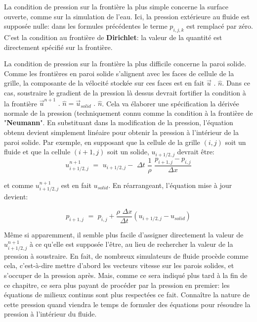 \documentclass[11pt]{report}
\begin{document}
La condition de pression sur la frontière la plus simple concerne la surface ouverte, comme sur la simulation de l'eau. Ici, la pression extérieure au fluide est supposée nulle: dans les formules précédentes le terme $p_{i,j,k}$ est remplacé par zéro. C'est la condition au frontière de \textbf{Dirichlet}: la valeur de la quantité est directement spécifié sur la frontière. \newline

La condition de pression sur la frontière la plus difficile concerne la paroi solide. Comme les frontières en paroi solide s'alignent avec les faces de cellule de la grille, la composante de la vélocité stockée sur ces faces est en fait $\overrightarrow{u} \,\,.\,\, \hat{n}$. Dans ce cas, soustraire le gradient de la pression là dessus devrait fortifier la condition à la frontière $\overrightarrow{u}^{n+1} \,\, . \,\, \hat{n} = \overrightarrow{u}_{solid} \,\, . \,\, \hat{n}$. Cela va élaborer une spécification la dérivée normale de la pression (techniquement connu comme la condition à la frontière de "\textbf{Neumann}". En substituant dans la modification de la pression, l'équation obtenu devient simplement linéaire pour obtenir la pression à l'intérieur de la paroi solide. Par exemple, en supposant que la cellule de la grille $(i,j)$ soit un fluide et que la cellule $(i+1,j)$ soit un solide, $u_{i+1/2, j}$ devrait être:
\begin{equation}
u_{i+1/2,j}^{n+1} \,\, = \,\, u_{i+1/2,j} - \,\, \Delta t \,\, \frac{1}{\rho} \,\,\frac{p_{i+1,j} - p_{i,j}}{\Delta x}
\end{equation}

et comme $ u_{i+1/2,j}^{n+1} $ est en fait $ u_{solid} $. En réarrangeant, l'équation mise à jour devient:

\begin{equation}
p_{i+1,j} \,\, = \,\, p_{i,j} + \frac{\rho \,\, \Delta x}{\Delta t} (u_{i+1/2,j} - u_{solid})
\end{equation}

Même si apparemment, il semble plus facile d'assigner directement la valeur de $u_{i+1/2,j}^{n+1}$ à ce qu'elle est supposée l'être, au lieu de rechercher la valeur de la pression à soustraire. En fait, de nombreux simulateurs de fluide procède comme cela, c'est-à-dire mettre d'abord  les vecteurs vitesse sur les parois solides, et s'occuper de la pression après. Mais, comme ce sera indiqué plus tard à la fin de ce chapitre, ce sera plus payant de procéder par la pression en premier: les équations de milieux continus sont plus respectées ce fait. Connaître la nature de cette pression quand viendra le temps de formuler des équations pour résoudre la pression à l'intérieur du fluide.\newline
\end{document}
